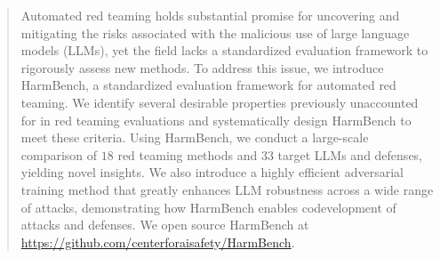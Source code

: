 \documentclass{article}
\theoremstyle{plain}
\theoremstyle{definition}
\theoremstyle{remark}
\begin{document}



\printAffiliationsAndNotice{}  %

\begin{abstract}
Automated red teaming holds substantial promise for uncovering and mitigating the risks associated with the malicious use of large language models (LLMs), yet the field lacks a standardized evaluation framework to rigorously assess new methods. To address this issue, we introduce HarmBench, a standardized evaluation framework for automated red teaming. We identify several desirable properties previously unaccounted for in red teaming evaluations and systematically design HarmBench to meet these criteria. Using HarmBench, we conduct a large-scale comparison of $18$ red teaming methods and $33$ target LLMs and defenses, yielding novel insights. We also introduce a highly efficient adversarial training method that greatly enhances LLM robustness across a wide range of attacks, demonstrating how HarmBench enables codevelopment of attacks and defenses. We open source HarmBench at \url{https://github.com/centerforaisafety/HarmBench}.
\end{abstract}
\end{document}
